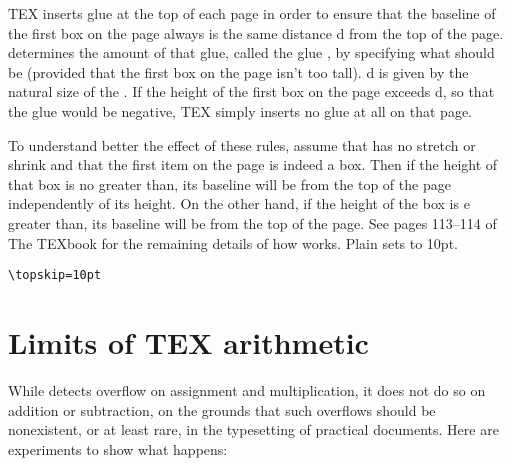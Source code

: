 {TEX inserts glue at the top of each page in order to ensure that the
baseline of the first box on the page always is the same distance d from
the top of the page. determines the amount of that glue, called
the  glue , by specifying what should be (provided that the
first box on the page isn't too tall). d is given by the natural size of the
. If the height of the first box on the page exceeds d, so
that the glue would be negative, TEX simply inserts no glue at
all on that page.


To understand better the effect of these rules, assume that
has no stretch or shrink and that the first item on the page is indeed a box.
Then if the height of that box is no greater than, its baseline
will be from the top of the page independently of its height.
On the other hand, if the height of the box is e greater than,
its baseline will be  from the top of the page. See pages 113--114 of The TEXbook for the remaining details of how works.
Plain \tex sets to 10pt.

\verb+\topskip=10pt+

\section{Limits of TEX arithmetic}

While \tex detects overflow on assignment and multiplication, it does not
do so on addition or subtraction, on the grounds that such overflows should
be nonexistent, or at least rare, in the typesetting of practical documents.
Here are experiments to show what happens:

}
